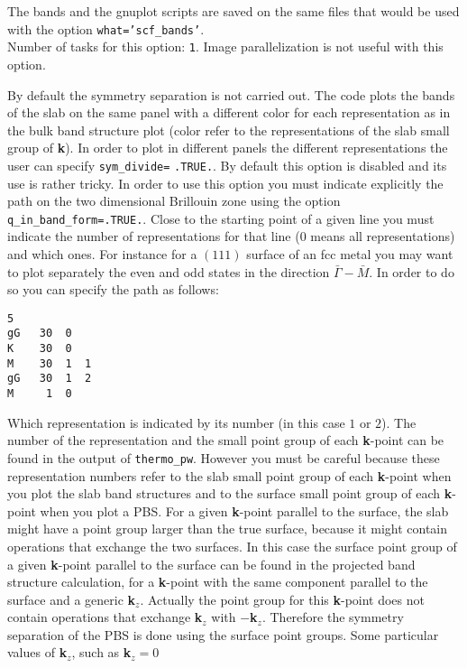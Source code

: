 \documentclass[12pt,a4paper]{article}
\begin{document}
The bands and the gnuplot scripts are saved on the same files that would
be used with the option \texttt{what='scf\_bands'}. \\
Number of tasks for this option: \texttt{1}. Image parallelization is
not useful with this option. 

By default the symmetry separation is not carried out. The code plots the
bands of the slab on the same panel with a different color for each 
representation as in the bulk band structure plot (color refer to the 
representations of the slab small group of {\bf k}). 
In order to plot in different panels the different representations
the user can specify \texttt{sym\_divide=} \texttt{.TRUE.}.
By default this option is disabled and its use is rather tricky.
In order to use this option you must indicate explicitly the
path on the two dimensional Brillouin zone using the option
\texttt{q\_in\_band\_form=.TRUE.}. Close to the
starting point of a given line you must indicate the number of 
representations for that line ($0$ means all representations) and which ones.
For instance for a $(111)$ surface of an fcc metal you may
want to plot separately the even and odd states in the direction 
$\bar \Gamma-\bar M$. In order to do so you can specify the path as follows:
\begin{verbatim}
5
gG   30  0
K    30  0
M    30  1  1
gG   30  1  2
M     1  0
\end{verbatim}
Which representation is indicated by its number (in this case $1$ or $2$).
The number of the representation and the small point group of each 
{\bf k}-point can be found in the output of \texttt{thermo\_pw}.
However you must be careful because these representation numbers refer
to the slab small point group of each {\bf k}-point when you
plot the slab band structures and to the surface small point 
group of each {\bf k}-point when you plot a PBS.
For a given {\bf k}-point parallel to the surface, the slab
might have a point group larger than the true surface, because it 
might contain operations that exchange the two surfaces.
In this case the surface point group of a given {\bf k}-point parallel 
to the surface can be found in the projected band structure calculation,
for a {\bf k}-point with the same component parallel to the surface
and a generic {\bf k}$_z$. Actually the point group for this {\bf k}-point 
does not contain operations that exchange {\bf k}$_z$ with $-${\bf k}$_z$.
Therefore the symmetry separation of the PBS is done using the
surface point groups. Some particular values of {\bf k}$_z$, such as 
{\bf k}$_z=0$
\end{document}
